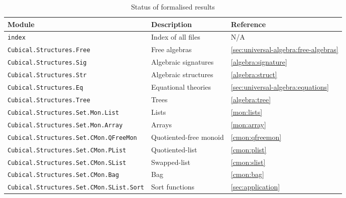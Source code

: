 \begin{table*}
    \centering
    \begin{tabular}{lll}
        \hline
        \textbf{Module}                                 & \textbf{Description}   & \textbf{Reference}                         \\ \hline
        \texttt{index}                                  & Index of all files     & N/A                                        \\
        \texttt{Cubical.Structures.Free}                & Free algebras          & \cref{sec:universal-algebra:free-algebras} \\
        \texttt{Cubical.Structures.Sig}                 & Algebraic signatures   & \cref{algebra:signature}                   \\
        \texttt{Cubical.Structures.Str}                 & Algebraic structures   & \cref{algebra:struct}                      \\
        \texttt{Cubical.Structures.Eq}                  & Equational theories    & \cref{sec:universal-algebra:equations}     \\
        \texttt{Cubical.Structures.Tree}                & Trees                  & \cref{algebra:tree}                        \\
        \texttt{Cubical.Structures.Set.Mon.List}        & Lists                  & \cref{mon:lists}                           \\
        \texttt{Cubical.Structures.Set.Mon.Array}       & Arrays                 & \cref{mon:array}                           \\
        \texttt{Cubical.Structures.Set.CMon.QFreeMon}   & Quotiented-free monoid & \cref{cmon:qfreemon}                       \\
        \texttt{Cubical.Structures.Set.CMon.PList}      & Quotiented-list        & \cref{cmon:plist}                          \\
        \texttt{Cubical.Structures.Set.CMon.SList}      & Swapped-list           & \cref{cmon:slist}                          \\
        \texttt{Cubical.Structures.Set.CMon.Bag}        & Bag                    & \cref{cmon:bag}                            \\
        \texttt{Cubical.Structures.Set.CMon.SList.Sort} & Sort functions         & \cref{sec:application}                     \\
        \hline
    \end{tabular}
    \caption{Status of formalised results}
    \label{tab:formalised-results}
\end{table*}
